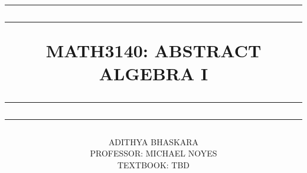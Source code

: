 \title{

    \rule{15cm}{1.6pt}\vspace*{-\baselineskip}\vspace*{2pt}
    \rule{15cm}{0.4pt}
	
	\vspace{0.75\baselineskip}
		
	\Huge{MATH3140: ABSTRACT ALGEBRA I\\\vspace{3mm}}

	\rule{15cm}{0.4pt}\vspace*{-\baselineskip}\vspace{3.2pt}
	\rule{15cm}{1.6pt}

}

\author{ADITHYA BHASKARA\\\vspace{0.4cm}\small{PROFESSOR: MICHAEL NOYES}\\\vspace{1em}\small{TEXTBOOK: TBD}}

\date{}